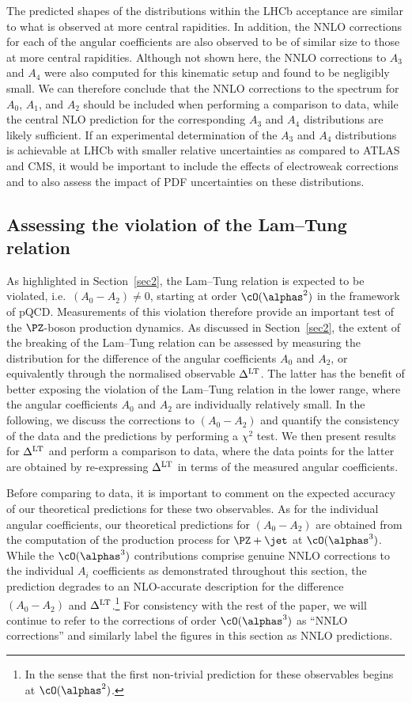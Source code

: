 The predicted shapes of the distributions within the LHCb acceptance are similar
to what is observed at more central rapidities. 
In addition, the NNLO corrections 
for each of the angular coefficients are also observed to be of similar size to those
at more central rapidities. Although not shown here, the NNLO corrections to $A_3$ and $A_4$
were also computed for this kinematic setup and found to be negligibly small.
%
We can therefore conclude that the NNLO corrections to the \ptz spectrum 
for $A_0$, $A_1$, and $A_2$ should be included when performing a comparison to data, while
the central NLO prediction for the corresponding $A_3$ and $A_4$ distributions are likely sufficient.
%
If an experimental determination of the $A_3$ and $A_4$ distributions is achievable at LHCb
with smaller relative uncertainties as compared to ATLAS and CMS, it would be important to include 
the effects of electroweak corrections and to also assess the impact of PDF uncertainties 
on these distributions.

\subsection{Assessing the violation of the Lam--Tung relation} 
\label{LamTung}
As highlighted in Section~\ref{sec2}, the Lam--Tung relation is expected to be violated, i.e.\ $(A_0-A_2)\ne0$,
starting at order $\cO(\alphas^2)$ in the framework of pQCD.
%
Measurements of this violation therefore provide an important test of the
$\PZ$-boson production dynamics. As discussed in Section~\ref{sec2}, 
the extent of the breaking of the Lam--Tung relation can be assessed by measuring 
the \ptz distribution for the difference of the angular coefficients $A_0$ and $A_2$, or equivalently through
the normalised observable $\Delta^{\rm LT}$. The latter has the benefit of better exposing 
the violation of the Lam--Tung relation in the lower \ptz range, where the angular 
coefficients $A_0$ and $A_2$ are individually relatively small.
%
In the following, we discuss the corrections to $(A_0-A_2)$ and quantify the consistency of the 
data and the predictions by performing a $\chi^2$ test. We then present results for $\Delta^{\rm LT}$ 
and perform a comparison to data, where the data points for the latter are obtained by 
re-expressing $\Delta^{\rm LT}$ in terms of the measured angular coefficients.

Before comparing to data, it is important to comment on the expected accuracy of our theoretical predictions for 
these two observables. As for the individual angular coefficients, our theoretical predictions for $(A_0-A_2)$ 
are obtained from the computation of the production process for $\PZ+\jet$ at $\cO(\alphas^3)$. 
While the $\cO(\alphas^3)$ contributions comprise genuine NNLO corrections to the individual $A_i$ coefficients 
as demonstrated throughout this section, the prediction degrades to an NLO-accurate description for the 
difference $(A_0-A_2)$ and $\Delta^{\rm LT}$.\footnote{In the sense that the first non-trivial prediction for these observables begins at $\cO(\alphas^2)$.}
For consistency with the rest of the paper, we will continue to refer to the corrections of order $\cO(\alphas^3)$ as 
``NNLO corrections'' and similarly label the figures in this section as NNLO predictions.

